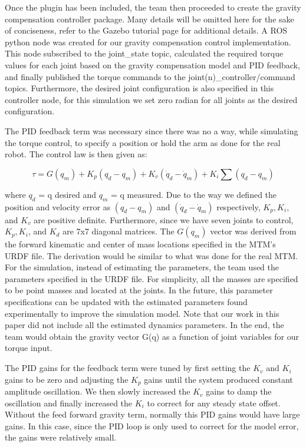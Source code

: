 \documentclass[conference]{IEEEtran}
\begin{document}
Once the plugin has been included, the team then proceeded to create the gravity compensation controller package. Many details will be omitted here for the sake of conciseness, refer to the Gazebo tutorial page for additional details. A ROS python node was created for our gravity compensation control implementation. This node subscribed to the joint{\_}state topic, calculated the required torque values for each joint based on the gravity compensation model and PID feedback, and finally published the torque commands to the joint(n){\_}controller/command topics. Furthermore, the desired joint configuration is also specified in this controller node, for this simulation we set zero radian for all joints as the desired configuration.

The PID feedback term was necessary since there was no a way, while simulating the torque control, to specify a position or hold the arm as done for the real robot. The control law is then given as:

\begin{equation}
\label{gravity_pid}
\tau = G(q_m) + K_p(q_d - q_m) + K_v(\dot{q}_d - \dot{q}_m) + K_i \sum (q_d - q_m)
\end{equation}

where $q_d$ = q desired and $q_m$ = q measured. Due to the way we defined the position and velocity error as $(q_d - q_m)$ and  $(\dot{q}_d - \dot{q}_m)$ respectively, $K_p, K_i$, and $K_v$ are positive definite. Furthermore, since we have seven joints to control, $K_p, K_i$, and $K_d$ are 7x7 diagonal matrices. The $G(q_m)$ vector was derived from the forward kinematic and center of mass locations specified in the MTM’s URDF file. The derivation would be similar to what was done for the real MTM. For the simulation, instead of estimating the parameters, the team used the parameters specified in the URDF file. For simplicity, all the masses are specified to be point masses and located at the joints. In the future, this parameter specifications can be updated with the estimated parameters found experimentally to improve the simulation model. Note that our work in this paper did not include all the estimated dynamics parameters. In the end, the team would obtain the gravity vector G(q) as a function of joint variables for our torque input.

The PID gains for the feedback term were tuned by first setting the $K_v$ and $K_i$ gains to be zero and adjusting the $K_p$ gains until the system produced constant amplitude oscillation. We then slowly increased the $K_v$ gains to damp the oscillation and finally increased the $K_i$ to correct for any steady state offset. Without the feed forward gravity term, normally this PID gains would have large gains. In this case, since the PID loop is only used to correct for the model error, the gains were relatively small.
\end{document}

